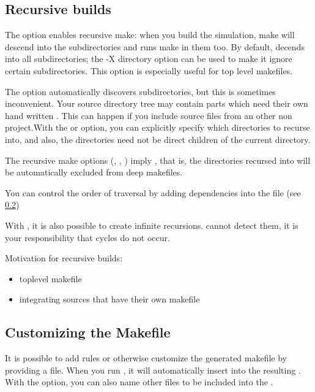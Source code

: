 \subsection{Recursive builds}


The  option enables recursive make: when you build the simulation, make
will descend into the subdirectories and runs make in them too.
By default,  decends into all subdirectories; the -X directory option
can be used to make it ignore certain subdirectories. This option is especially useful
for top level makefiles.


The  option automatically discovers subdirectories, but this
is sometimes inconvenient. Your source directory tree may contain 
parts which need their own hand written . This can happen if 
you include source files from an other non {\opp} project.With the  
or  option, you can explicitly specify which directories to 
recurse into, and also, the directories need not be direct children of the 
current directory.


The recursive make options (, , )
imply , that is, the directories recursed into will be
automatically excluded from deep makefiles.


You can control the order of traversal by adding dependencies into
the  file (see \ref{sec:makefrag})

\begin{note}
With , it is also possible to create infinite recursions.
 cannot detect them, it is your responsibility that
cycles do not occur.
\end{note}


Motivation for recursive builds:
\begin{itemize}
 \item{toplevel makefile}
 \item{integrating sources that have their own makefile}
\end{itemize}


\subsection{Customizing the Makefile}
\label{sec:makefrag}

It is possible to add rules or otherwise customize the generated makefile
by providing a  file. When you run , it
will automatically insert  into the resulting .
With the  option, you can also name other files to be included into the
.


